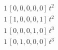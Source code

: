 \begin{align*}
1\,[0,0,0,0,0]\,t^{2} \\
1\,[1,0,0,0,1]\,t^{2} \\
1\,[0,0,0,1,0]\,t^{3} \\
1\,[0,1,0,0,0]\,t^{3}
\end{align*}

